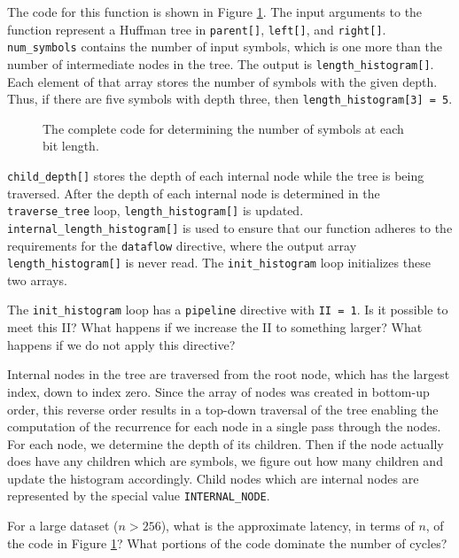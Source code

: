The code for this function is shown in Figure \ref{fig:huffman_compute_bit_length.cpp}.  The input arguments to the function represent a Huffman tree in \lstinline{parent[]}, \lstinline{left[]}, and \lstinline{right[]}.   \lstinline{num_symbols} contains the number of input symbols, which is one more than the number of intermediate nodes in the tree.  The output is \lstinline{length_histogram[]}.  Each element of that array stores the number of symbols with the given depth. Thus, if there are five symbols with depth three, then \lstinline{length_histogram[3] = 5}. 
\begin{figure}

\caption{The complete code for determining the number of symbols at each bit length.}
\label{fig:huffman_compute_bit_length.cpp}
\end{figure}

\lstinline{child_depth[]} stores the depth of each internal node while the tree is being traversed.  After the depth of each internal node is determined in the \lstinline{traverse_tree} loop, \lstinline{length_histogram[]} is updated.  \lstinline{internal_length_histogram[]} is used to ensure that our function adheres to the requirements for the \lstinline{dataflow} directive, where the output array \lstinline{length_histogram[]} is never read.  The \lstinline{init_histogram} loop initializes these two arrays.

\begin{exercise}
The \lstinline{init_histogram} loop has a \lstinline{pipeline} directive with \lstinline{II = 1}. Is it possible to meet this II? What happens if we increase the II to something larger? What happens if we do not apply this directive?
\end{exercise}

Internal nodes in the tree are traversed from the root node, which has the largest index, down to index zero.  Since the array of nodes was created in bottom-up order, this reverse order results in a top-down traversal of the tree enabling the computation of the recurrence for each node in a single pass through the nodes.  For each node, we determine the depth of its children.  Then if the node actually does have any children which are symbols, we figure out how many children and update the histogram accordingly.  Child nodes which are internal nodes are represented by the special value \lstinline{INTERNAL_NODE}.

\begin{exercise}
For a large dataset ($n > 256$), what is the approximate latency, in terms of $n$, of the code in Figure \ref{fig:huffman_compute_bit_length.cpp}?  What portions of the code dominate the number of cycles?
\end{exercise}

